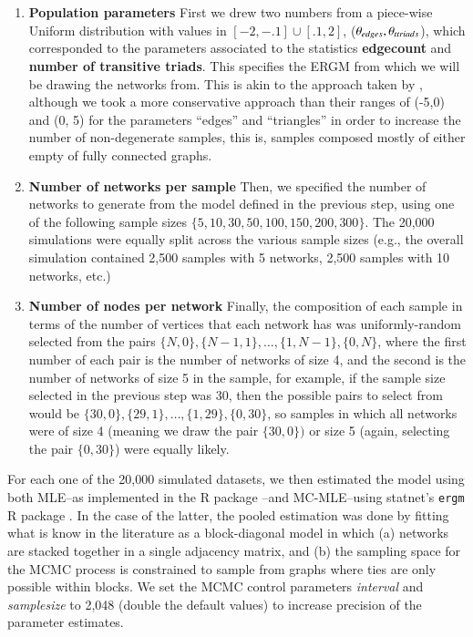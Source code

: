 \documentclass[review]{elsarticle}
\begin{document}
\begin{enumerate}
\item \textbf{Population parameters} First we drew two numbers from a piece-wise Uniform distribution with values in $[-2, -.1]\cup[.1, 2]$, ($\theta_{edges}, \theta_{ttriads}$), which corresponded to the parameters associated to the statistics \textbf{edgecount} and \textbf{number of transitive triads}. This specifies the ERGM from which we will be drawing the networks from. This is akin to the approach taken by \cite{Schweinberger2015} , although we took a more conservative approach than their ranges of (-5,0) and (0, 5) for the parameters ``edges'' and ``triangles'' in order to increase the number of non-degenerate samples, this is, samples composed mostly of either empty of fully connected graphs.

\item \textbf{Number of networks per sample} Then, we specified the number of networks to generate from the model defined in the previous step, using one of the following sample sizes $\{5, 10, 30, 50, 100, 150, 200, 300\}$. The 20,000 simulations were equally split across the various sample sizes (e.g., the overall simulation contained 2,500 samples with 5 networks, 2,500 samples with 10 networks, etc.)

\item \textbf{Number of nodes per network} Finally, the composition of each sample in terms of the number of vertices that each network has was uniformly-random selected from the pairs $\{N, 0\}, \{N - 1, 1\}, \dots, \{1, N - 1\}, \{0, N\}$, where the first number of each pair is the number of networks of size 4, and the second is the number of networks of size 5 in the sample, for example, if the sample size selected in the previous step was 30, then the possible pairs to select from would be $\{30, 0\}, \{29, 1\}, \dots, \{1, 29\}, \{0, 30\}$, so samples in which all networks were of size 4 (meaning we draw the pair $\{30, 0\})$ or size 5 (again, selecting the pair  $\{0, 30\}$) were equally likely. 
\end{enumerate}

For each one of the 20,000 simulated datasets, we then estimated the model using both MLE--as implemented in the \ergmito{} R package \cite{vegayon2018}--and MC-MLE--using statnet's \texttt{ergm} R package \cite{Handcock2018,hunter2008}. In the case of the latter, the pooled estimation was done by fitting what is know in the literature as a block-diagonal model in which (a) networks are stacked together in a single adjacency matrix, and (b) the sampling space for the MCMC process is constrained to sample from graphs where ties are only possible within blocks. We set the MCMC control parameters \textit{interval} and \textit{samplesize} to 2,048 (double the default values) to increase precision of the parameter estimates.
\end{document}
